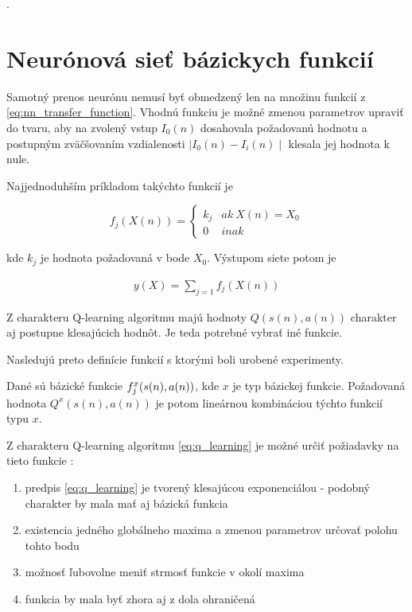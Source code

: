 .

\section{Neurónová sieť bázickych funkcií}

Samotný prenos neurónu nemusí byť obmedzený len na množinu funkcií z \ref{eq:nn_transfer_function}.
Vhodnú funkciu je možné zmenou parametrov upraviť do tvaru, aby na zvolený
vstup $I_0(n)$ dosahovala požadovanú hodnotu a postupným zväčšovaním
vzdialenosti $\mid I_0(n) - I_i(n) \mid$ klesala jej hodnota k nule.

Najjednoduhším príkladom takýchto funkcií  je


\begin{equation}
f_j(X(n)) =
\left\{
	\begin{array}{ll}
		k_j  & ak \ X(n) = X_0 \\
		0 & inak
	\end{array}
\right.
\label{eq:bfnn_simple}
\end{equation}

kde $k_j$ je hodnota požadovaná v bode $X_0$. Výstupom siete potom je

\begin{align}
y(X) = \sum\limits_{j=1} f_j(X(n))
\label{eq:bfnn_simple_res}
\end{align}

Z charakteru Q-learning algoritmu majú hodnoty $Q(s(n),a(n))$ charakter aj
postupne klesajúcich hodnôt. Je teda potrebné vybrať iné funkcie.

Nasledujú preto definície funkcií s ktorými boli urobené experimenty.

Dané sú bázické funkcie $f_j^x(\boldmath{s(n), a(n)})$, kde $x$ je typ bázickej funkcie.
Požadovaná hodnota $Q^x(s(n), a(n))$ je potom lineárnou kombináciou týchto funkcií typu $x$.

Z charakteru Q-learning algoritmu \ref{eq:q_learning} je možné určiť požiadavky na
tieto funkcie :

\begin{enumerate}
\item predpis \ref{eq:q_learning} je tvorený klesajúcou exponenciálou - podobný charakter by mala mať aj bázická funkcia
\item existencia jedného globálneho maxima a zmenou parametrov určovať polohu tohto bodu
\item možnosť ľubovolne meniť strmosť funkcie v okolí maxima
\item funkcia by mala byť zhora aj z dola ohraničená
\end{enumerate}

